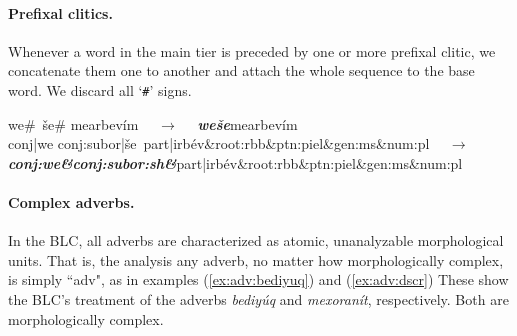 
\paragraph{Prefixal clitics.}
Whenever a word in the main tier is preceded by one or more prefixal clitic, we concatenate them one to another and attach the whole sequence to the base word. We discard all `\texttt{\#}' signs.
\begin{exe}\label{ex:preclitics}
	\ex
	\textsf{we\#\, \v{s}e\# mearbev\'im} $\quad\to\quad$ \textbf{\textit{\textsf{we\v{s}e}}}\textsf{mearbev\'im}\\
	\textsf{conj|we conj:subor|\v{s}e\, part|irb\'ev\&root:rbb\&ptn:piel\&gen:ms\&num:pl} $\quad\to\quad$  \\
	\textit{\textbf{\textsf{conj:we\&conj:subor:sh\&}}}\textsf{part|irb\'ev\&root:rbb\&ptn:piel\&gen:ms\&num:pl}  \\
\end{exe}

\paragraph{Complex adverbs.} In the BLC, all adverbs are characterized as atomic, unanalyzable morphological units. That is,
the analysis any adverb, no matter how morphologically complex, is simply ``adv", as in 
examples (\ref{ex:adv:bediyuq}) and (\ref{ex:adv:dscr})  These show the BLC's treatment of the adverbs \textit{\textsf{bediy\'{u}q}} and \textit{\textsf{mexoran\'{i}t}}, respectively. Both are 
morphologically complex.

